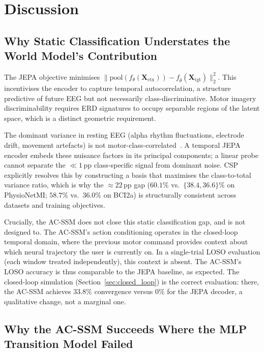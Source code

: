 \documentclass[journal]{IEEEtran}
\begin{document}
\section{Discussion}
\label{sec:discussion}

\subsection{Why Static Classification Understates the World Model's Contribution}
\label{sec:why_fail}

The JEPA objective minimises $\|\text{pool}(f_\theta(\mathbf{X}_\text{ctx})) - f_{\bar\theta}(\mathbf{X}_\text{tgt})\|_2^2$.
This incentivises the encoder to capture temporal autocorrelation, a structure predictive of future EEG but not necessarily class-discriminative.
Motor imagery discriminability requires ERD signatures to occupy separable regions of the latent space, which is a distinct geometric requirement.

The dominant variance in resting EEG (alpha rhythm fluctuations, electrode drift, movement artefacts) is not motor-class-correlated~\cite{blankertz2011single}.
A temporal JEPA encoder embeds these nuisance factors in its principal components; a linear probe cannot separate the $\ll 1$\,pp class-specific signal from dominant noise.
CSP explicitly resolves this by constructing a basis that maximises the class-to-total variance ratio, which is why the $\approx\!22$\,pp gap ($60.1\%$ vs.\ $\{38.4, 36.6\}\%$ on PhysioNetMI; $58.7\%$ vs.\ $36.0\%$ on BCI2a) is structurally consistent across datasets and training objectives.

Crucially, the AC-SSM does not close this static classification gap, and is not designed to.
The AC-SSM's action conditioning operates in the closed-loop temporal domain, where the previous motor command provides context about which neural trajectory the user is currently on.
In a single-trial LOSO evaluation (each window treated independently), this context is absent.
The AC-SSM's LOSO accuracy is thus comparable to the JEPA baseline, as expected.
The closed-loop simulation (Section~\ref{sec:closed_loop}) is the correct evaluation: there, the AC-SSM achieves $33.8\%$ convergence versus $0\%$ for the JEPA decoder, a qualitative change, not a marginal one.

\subsection{Why the AC-SSM Succeeds Where the MLP Transition Model Failed}
\label{sec:world_model_value}
\end{document}
